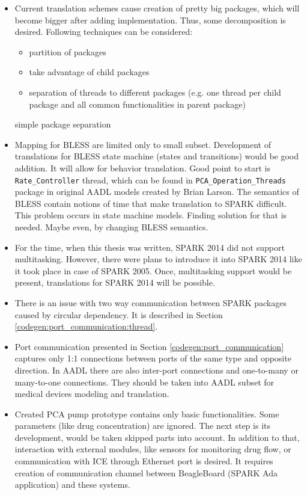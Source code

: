 \begin{itemize}
	\item Current translation schemes cause creation of pretty big packages, which will become bigger after adding implementation. Thus, some decomposition is desired. Following techniques can be considered: 
		\begin{itemize}
			\item partition of packages
			\item take advantage of child packages
			\item separation of threads to different packages (e.g. one thread per child package and all common functionalities in parent package)
		\end{itemize} simple package separation
	\item Mapping for BLESS are limited only to small subset. Development of translations for BLESS state machine (states and transitions) would be good addition. It will allow for behavior translation. Good point to start is \lstinline{Rate_Controller} thread, which can be found in \lstinline{PCA_Operation_Threads} package in original AADL models created by Brian Larson. The semantics of BLESS contain notions of time that make translation to SPARK difficult. This problem occurs in state machine models. Finding solution for that is needed. Maybe even, by changing BLESS semantics.
	\item For the time, when this thesis was written, SPARK 2014 did not support multitasking. However, there were plans to introduce it into SPARK 2014 like it took place in case of SPARK 2005. Once, multitasking support would be present, translations for SPARK 2014 will be possible.
	\item There is an issue with two way communication between SPARK packages caused by circular dependency. It is described in Section \ref{codegen:port_communication:thread}.
	\item Port communication presented in Section \ref{codegen:port_communication} captures only 1:1 connections between ports of the same type and opposite direction. In AADL there are also inter-port connections and one-to-many or many-to-one connections. \cite{AadlBook} They should be taken into AADL subset for medical devices modeling and translation. 
	\item Created PCA pump prototype contains only basic functionalities. Some parameters (like drug concentration) are ignored. The next step is its development, would be taken skipped parts into account. In addition to that, interaction with external modules, like sensors for monitoring drug flow, or communication with ICE through Ethernet port is desired. It requires creation of communication channel 	between BeagleBoard (SPARK Ada application) and these systems. 		
\end{itemize}
